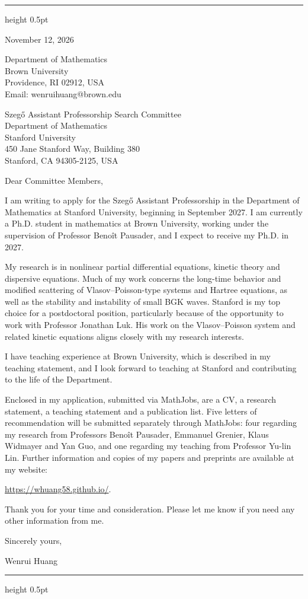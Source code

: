 \documentclass[10pt]{article}
\begin{document}
\vspace{0.08in}
\hrule height 0.5pt

\vspace{0.47in}
\hfill
\begin{minipage}{2.27in}
November 12, 2026

\vspace{0.16in}
Department of Mathematics\\
Brown University\\
Providence, RI 02912, USA\\
Email: wenrui\textunderscore huang@brown.edu
\end{minipage}

\vspace{0.30in}
Szeg\H{o} Assistant Professorship Search Committee\\
Department of Mathematics\\
Stanford University\\
450 Jane Stanford Way, Building 380\\
Stanford, CA 94305-2125, USA

\vspace{0.16in}
Dear Committee Members,

I am writing to apply for the Szeg\H{o} Assistant Professorship in the Department of Mathematics at Stanford University, beginning in September 2027. I am currently a Ph.D. student in mathematics at Brown University, working under the supervision of Professor Beno\^{i}t Pausader, and I expect to receive my Ph.D. in 2027.

My research is in nonlinear partial differential equations, kinetic theory and dispersive equations. Much of my work concerns the long-time behavior and modified scattering of Vlasov--Poisson-type systems and Hartree equations, as well as the stability and instability of small BGK waves. Stanford is my top choice for a postdoctoral position, particularly because of the opportunity to work with Professor Jonathan Luk. His work on the Vlasov--Poisson system and related kinetic equations aligns closely with my research interests.

I have teaching experience at Brown University, which is described in my teaching statement, and I look forward to teaching at Stanford and contributing to the life of the Department.

Enclosed in my application, submitted via MathJobs, are a CV, a research statement, a teaching statement and a publication list. Five letters of recommendation will be submitted separately through MathJobs: four regarding my research from Professors Beno\^{i}t Pausader, Emmanuel Grenier, Klaus Widmayer and Yan Guo, and one regarding my teaching from Professor Yu-lin Lin. Further information and copies of my papers and preprints are available at my website:

\url{https://whuang58.github.io/}.

\medskip
Thank you for your time and consideration. Please let me know if you need any other information from me.

\vspace{0.12in}
Sincerely yours,

\vspace{0.12in}
Wenrui Huang

\vfill
\hrule height 0.5pt
\end{document}

